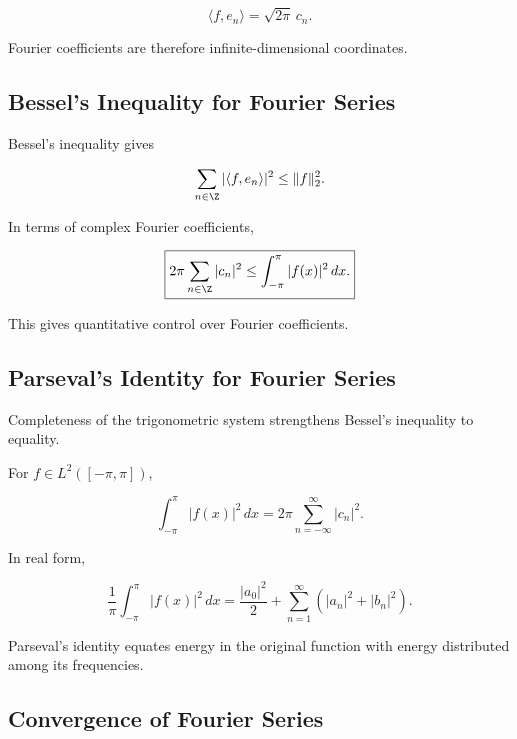 \[
\boxed{
\langle f,e_n\rangle
=
\sqrt{2\pi}\,c_n.
}
\]

Fourier coefficients are therefore infinite-dimensional coordinates.

\subsection{Bessel's Inequality for Fourier Series}
\label{subsec:bessel-fourier}

Bessel's inequality gives

\[
\sum_{n\in\Z}
|\langle f,e_n\rangle|^2
\leq
\|f\|_2^2.
\]

In terms of complex Fourier coefficients,

\[
\boxed{
2\pi
\sum_{n\in\Z}|c_n|^2
\leq
\int_{-\pi}^{\pi}|f(x)|^2\,dx.
}
\]

This gives quantitative control over Fourier coefficients.

\subsection{Parseval's Identity for Fourier Series}
\label{subsec:parseval-fourier-series}

Completeness of the trigonometric system strengthens Bessel's inequality
to equality.

\begin{theorem}
For \(f\in L^2([-\pi,\pi])\),

\[
\boxed{
\int_{-\pi}^{\pi}|f(x)|^2\,dx
=
2\pi
\sum_{n=-\infty}^{\infty}|c_n|^2.
}
\]
\end{theorem}

In real form,

\[
\boxed{
\frac1\pi
\int_{-\pi}^{\pi}|f(x)|^2\,dx
=
\frac{|a_0|^2}{2}
+
\sum_{n=1}^{\infty}
\left(
|a_n|^2+|b_n|^2
\right).
}
\]

Parseval's identity equates energy in the original function with energy
distributed among its frequencies.

\subsection{Convergence of Fourier Series}
\label{subsec:convergence-fourier-series}

